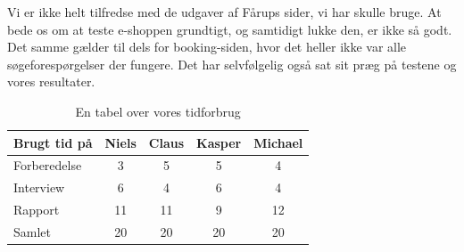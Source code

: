 \documentclass[10pt,a4paper]{article}      %
\begin{document}
Vi er ikke helt tilfredse med de udgaver af Fårups sider, vi har skulle bruge. At bede os om at teste e-shoppen grundtigt, og samtidigt lukke den, er ikke så godt. Det samme gælder til dels for booking-siden, hvor det heller ikke var alle søgeforespørgelser der fungere. Det har selvfølgelig også sat sit præg på testene og vores resultater.

\begin{table}[htbp]
  \centering
  \begin{tabular}{lcccc}
    \toprule
    \textbf{Brugt tid på} & {Niels} & {Claus}  & {Kasper}  & {Michael} \\
    \midrule
    Forberedelse & 3  & 5  & 5 & 4   \\
    Interview    & 6  & 4  & 6 & 4   \\
    Rapport      & 11 & 11 & 9 & 12  \\
    \midrule
    Samlet & 20 & 20 & 20 & 20 \\
    \bottomrule
  \end{tabular}
  \caption{En tabel over vores tidforbrug}
  \label{tab:tidsforbrug}
\end{table}
\end{document}
